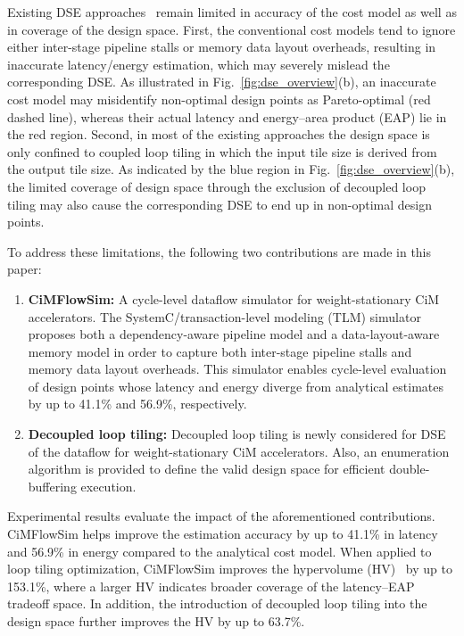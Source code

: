\documentclass[lettersize,journal]{IEEEtran}
\begin{document}
Existing DSE approaches~\cite{maestro_micro2019, timeloop_ispass2019, zheng2023tileflow, zigzag_tc2021, wang2025atb, peng2021neurosim, eflowsim_date} remain limited in accuracy of the cost model as well as in coverage of the design space.
First, the conventional cost models tend to ignore either inter-stage pipeline stalls or memory data layout overheads, resulting in inaccurate latency/energy estimation, which may severely mislead the corresponding DSE. As illustrated in Fig.~\ref{fig:dse_overview}(b), an inaccurate cost model may misidentify non-optimal design points as Pareto-optimal (red dashed line), whereas their actual latency and energy--area product (EAP) lie in the red region. 
Second, in most of the existing approaches the design space is only confined to coupled loop tiling in which the input tile size is derived from the output tile size. As indicated by the blue region in Fig.~\ref{fig:dse_overview}(b), the limited coverage of design space through the exclusion of decoupled loop tiling may also cause the corresponding DSE to end up in non-optimal design points.

To address these limitations, the following two contributions are made in this paper:
\begin{enumerate}
\item \textbf{CiMFlowSim:} A cycle-level dataflow simulator for weight-stationary CiM accelerators. The SystemC/transaction-level modeling (TLM) simulator proposes both a dependency-aware pipeline model and a data-layout-aware memory model in order to capture both inter-stage pipeline stalls and memory data layout overheads. This simulator enables cycle-level evaluation of design points whose latency and energy diverge from analytical estimates by up to 41.1\% and 56.9\%, respectively.
\item \textbf{Decoupled loop tiling:} Decoupled loop tiling is newly considered for DSE of the dataflow for weight-stationary CiM accelerators. Also, an enumeration algorithm is provided to define the valid design space for efficient double-buffering execution.
\end{enumerate}

Experimental results evaluate the impact of the aforementioned contributions.
CiMFlowSim helps improve the estimation accuracy by up to 41.1\% in latency and 56.9\% in energy compared to the analytical cost model. When applied to loop tiling optimization, CiMFlowSim improves the hypervolume (HV)~\cite{xu2025rankdse} by up to 153.1\%, where a larger HV indicates broader coverage of the latency--EAP tradeoff space. In addition, the introduction of decoupled loop tiling into the design space further improves the HV by up to 63.7\%.
\end{document}
